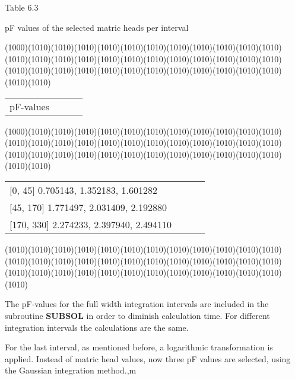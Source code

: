 Table 6.3
\testlastline

\begin{indenting}{2.54cm}
pF values of the selected matric heads per interval
\end{indenting}
\GrBox(1000)\GrBox(1010)\GrBox(1010)\GrBox(1010)\GrBox(1010)\GrBox(1010)\GrBox(1010)\GrBox(1010)\GrBox(1010)\GrBox(1010)\GrBox(1010)\GrBox(1010)\GrBox(1010)\GrBox(1010)\GrBox(1010)\GrBox(1010)\GrBox(1010)\GrBox(1010)\GrBox(1010)\GrBox(1010)\GrBox(1010)\GrBox(1010)\GrBox(1010)\GrBox(1010)\GrBox(1010)\GrBox(1010)\GrBox(1010)\GrBox(1010)\GrBox(1010)\GrBox(1010)\GrBox(1010)\GrBox(1010)\GrBox(1010)\GrBox(1010)\GrBox(1010)\GrBox(1010)\GrBox(1010)\GrBox(1010)\nwln
\begin{tabularx}{\textwidth}{llXr}



     pF-values
\end{tabularx}
\GrBox(1000)\GrBox(1010)\GrBox(1010)\GrBox(1010)\GrBox(1010)\GrBox(1010)\GrBox(1010)\GrBox(1010)\GrBox(1010)\GrBox(1010)\GrBox(1010)\GrBox(1010)\GrBox(1010)\GrBox(1010)\GrBox(1010)\GrBox(1010)\GrBox(1010)\GrBox(1010)\GrBox(1010)\GrBox(1010)\GrBox(1010)\GrBox(1010)\GrBox(1010)\GrBox(1010)\GrBox(1010)\GrBox(1010)\GrBox(1010)\GrBox(1010)\GrBox(1010)\GrBox(1010)\GrBox(1010)\GrBox(1010)\GrBox(1010)\GrBox(1010)\GrBox(1010)\GrBox(1010)\GrBox(1010)\GrBox(1010)\nwln
\begin{tabularx}{\textwidth}{llXr}



[0, 45]   0.705143,    1.352183,    1.601282    \\
{}[45, 170]   1.771497,    2.031409,    2.192880    \\
{}[170, 330]   2.274233,    2.397940,    2.494110    
\end{tabularx}
\GrBox(1010)\GrBox(1010)\GrBox(1010)\GrBox(1010)\GrBox(1010)\GrBox(1010)\GrBox(1010)\GrBox(1010)\GrBox(1010)\GrBox(1010)\GrBox(1010)\GrBox(1010)\GrBox(1010)\GrBox(1010)\GrBox(1010)\GrBox(1010)\GrBox(1010)\GrBox(1010)\GrBox(1010)\GrBox(1010)\GrBox(1010)\GrBox(1010)\GrBox(1010)\GrBox(1010)\GrBox(1010)\GrBox(1010)\GrBox(1010)\GrBox(1010)\GrBox(1010)\GrBox(1010)\GrBox(1010)\GrBox(1010)\GrBox(1010)\GrBox(1010)\GrBox(1010)\GrBox(1010)\GrBox(1010)


The pF-values for the full width integration intervals are included in the subroutine
{\bf SUBSOL} in order to diminish calculation time. For different integration intervals the
calculations are the same. 


For the last interval, as mentioned before, a logarithmic transformation is applied. Instead
of matric head values, now three pF values are selected, using the Gaussian integration
method.,m

